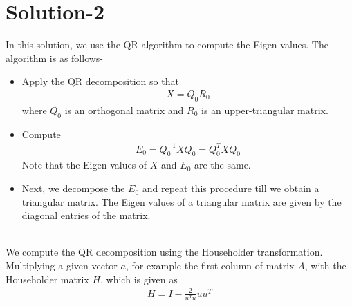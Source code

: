 \documentclass[journal,12pt,twocolumn]{IEEEtran}
\begin{document}
\section{\textbf{Solution-2}}
In this solution, we use the QR-algorithm to compute the Eigen values. The algorithm is as follows-
\begin{itemize}
    \item Apply the QR decomposition so that
            \begin{align*}
                X = Q_0R_0
            \end{align*}
            where $Q_0$ is an orthogonal matrix and $R_0$ is an upper-triangular matrix.
    \item Compute 
          \begin{align*}
                E_0 = Q_0^{-1} X Q_0 = Q_0 ^ T X Q_0
            \end{align*} 
            Note that the Eigen values of $X$ and $E_0$ are the same.
    \item Next, we decompose the $E_0$ and repeat this procedure till we obtain a triangular matrix. The Eigen values of a triangular matrix are given by the diagonal entries of the matrix.
\end{itemize}

\\
We compute the QR decomposition using the Householder transformation.
Multiplying a given vector $a$, for example the first column of matrix $A$, with the Householder matrix $H$, which is given as
\begin{align*}
    H=I-\frac{2}{u^{T} u} u u^{T}
\end{align*}
\end{document}
